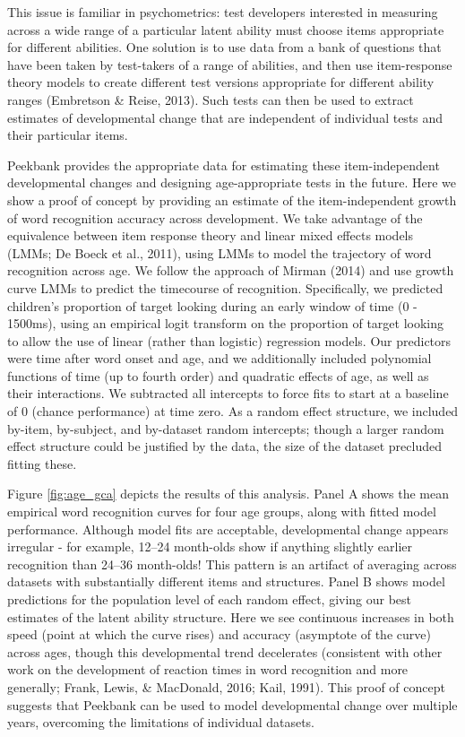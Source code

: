 \documentclass[10pt, letterpaper]{article}
\begin{document}
This issue is familiar in psychometrics: test developers interested in
measuring across a wide range of a particular latent ability must choose
items appropriate for different abilities. One solution is to use data
from a bank of questions that have been taken by test-takers of a range
of abilities, and then use item-response theory models to create
different test versions appropriate for different ability ranges
(Embretson \& Reise, 2013). Such tests can then be used to extract
estimates of developmental change that are independent of individual
tests and their particular items.

Peekbank provides the appropriate data for estimating these
item-independent developmental changes and designing age-appropriate
tests in the future. Here we show a proof of concept by providing an
estimate of the item-independent growth of word recognition accuracy
across development. We take advantage of the equivalence between item
response theory and linear mixed effects models (LMMs; De Boeck et al.,
2011), using LMMs to model the trajectory of word recognition across
age. We follow the approach of Mirman (2014) and use growth curve LMMs
to predict the timecourse of recognition. Specifically, we predicted
children's proportion of target looking during an early window of time
(0 - 1500ms), using an empirical logit transform on the proportion of
target looking to allow the use of linear (rather than logistic)
regression models. Our predictors were time after word onset and age,
and we additionally included polynomial functions of time (up to fourth
order) and quadratic effects of age, as well as their interactions. We
subtracted all intercepts to force fits to start at a baseline of 0
(chance performance) at time zero. As a random effect structure, we
included by-item, by-subject, and by-dataset random intercepts; though a
larger random effect structure could be justified by the data, the size
of the dataset precluded fitting these.

Figure \ref{fig:age_gca} depicts the results of this analysis. Panel A
shows the mean empirical word recognition curves for four age groups,
along with fitted model performance. Although model fits are acceptable,
developmental change appears irregular - for example, 12--24 month-olds
show if anything slightly earlier recognition than 24--36 month-olds!
This pattern is an artifact of averaging across datasets with
substantially different items and structures. Panel B shows model
predictions for the population level of each random effect, giving our
best estimates of the latent ability structure. Here we see continuous
increases in both speed (point at which the curve rises) and accuracy
(asymptote of the curve) across ages, though this developmental trend
decelerates (consistent with other work on the development of reaction
times in word recognition and more generally; Frank, Lewis, \&
MacDonald, 2016; Kail, 1991). This proof of concept suggests that
Peekbank can be used to model developmental change over multiple years,
overcoming the limitations of individual datasets.
\end{document}

